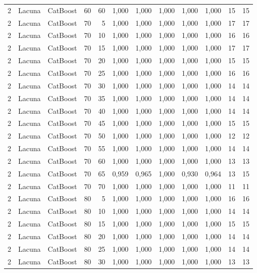 \begin{longtable}{ccclrrrrrrrr}
2 & Lacuna & CatBoost & 60 & 60 & 1,000 & 1,000 & 1,000 & 1,000 & 1,000 & 15 & 15 \\
2 & Lacuna & CatBoost & 70 & 5 & 1,000 & 1,000 & 1,000 & 1,000 & 1,000 & 17 & 17 \\
2 & Lacuna & CatBoost & 70 & 10 & 1,000 & 1,000 & 1,000 & 1,000 & 1,000 & 16 & 16 \\
2 & Lacuna & CatBoost & 70 & 15 & 1,000 & 1,000 & 1,000 & 1,000 & 1,000 & 17 & 17 \\
2 & Lacuna & CatBoost & 70 & 20 & 1,000 & 1,000 & 1,000 & 1,000 & 1,000 & 15 & 15 \\
2 & Lacuna & CatBoost & 70 & 25 & 1,000 & 1,000 & 1,000 & 1,000 & 1,000 & 16 & 16 \\
2 & Lacuna & CatBoost & 70 & 30 & 1,000 & 1,000 & 1,000 & 1,000 & 1,000 & 14 & 14 \\
2 & Lacuna & CatBoost & 70 & 35 & 1,000 & 1,000 & 1,000 & 1,000 & 1,000 & 14 & 14 \\
2 & Lacuna & CatBoost & 70 & 40 & 1,000 & 1,000 & 1,000 & 1,000 & 1,000 & 14 & 14 \\
2 & Lacuna & CatBoost & 70 & 45 & 1,000 & 1,000 & 1,000 & 1,000 & 1,000 & 15 & 15 \\
2 & Lacuna & CatBoost & 70 & 50 & 1,000 & 1,000 & 1,000 & 1,000 & 1,000 & 12 & 12 \\
2 & Lacuna & CatBoost & 70 & 55 & 1,000 & 1,000 & 1,000 & 1,000 & 1,000 & 14 & 14 \\
2 & Lacuna & CatBoost & 70 & 60 & 1,000 & 1,000 & 1,000 & 1,000 & 1,000 & 13 & 13 \\
2 & Lacuna & CatBoost & 70 & 65 & 0,959 & 0,965 & 1,000 & 0,930 & 0,964 & 13 & 15 \\
2 & Lacuna & CatBoost & 70 & 70 & 1,000 & 1,000 & 1,000 & 1,000 & 1,000 & 11 & 11 \\
2 & Lacuna & CatBoost & 80 & 5 & 1,000 & 1,000 & 1,000 & 1,000 & 1,000 & 16 & 16 \\
2 & Lacuna & CatBoost & 80 & 10 & 1,000 & 1,000 & 1,000 & 1,000 & 1,000 & 14 & 14 \\
2 & Lacuna & CatBoost & 80 & 15 & 1,000 & 1,000 & 1,000 & 1,000 & 1,000 & 15 & 15 \\
2 & Lacuna & CatBoost & 80 & 20 & 1,000 & 1,000 & 1,000 & 1,000 & 1,000 & 14 & 14 \\
2 & Lacuna & CatBoost & 80 & 25 & 1,000 & 1,000 & 1,000 & 1,000 & 1,000 & 14 & 14 \\
2 & Lacuna & CatBoost & 80 & 30 & 1,000 & 1,000 & 1,000 & 1,000 & 1,000 & 13 & 13 \\

\end{longtable}
